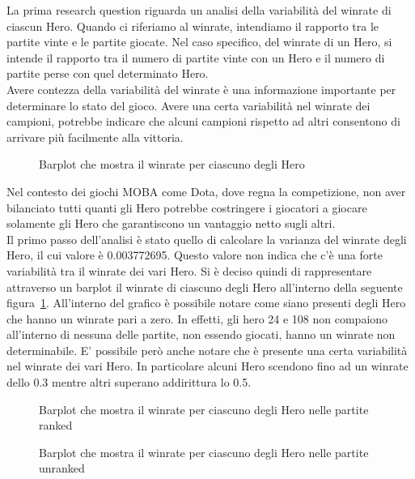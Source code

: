 La prima research question riguarda un analisi della variabilità del winrate di ciascun Hero. Quando ci riferiamo al winrate, intendiamo il rapporto tra le partite vinte e le partite giocate. Nel caso specifico, del winrate di un Hero, si intende il rapporto tra il numero di partite vinte con un Hero e il numero di partite perse con quel determinato Hero. \\
Avere contezza della variabilità del winrate è una informazione importante per determinare lo stato del gioco. Avere una certa variabilità nel winrate dei campioni, potrebbe indicare che alcuni campioni rispetto ad altri consentono di arrivare più facilmente alla vittoria. \\
\begin{figure}[htbp]
\begin{center}

\caption{Barplot che mostra il winrate per ciascuno degli Hero}
\label{winrate_totale}
\end{center}
\end{figure}
Nel contesto dei giochi MOBA come Dota, dove regna la competizione, non aver bilanciato tutti quanti gli Hero potrebbe costringere i giocatori a giocare solamente gli Hero che garantiscono un vantaggio netto sugli altri. \\
Il primo passo dell'analisi è stato quello di calcolare la varianza del winrate degli Hero, il cui valore è 0.003772695. Questo valore non indica che c'è una forte variabilità tra il winrate dei vari Hero.
Si è deciso quindi di rappresentare attraverso un barplot il winrate di ciascuno degli Hero all'interno della seguente figura~\ref{winrate_totale}. All'interno del grafico è possibile notare come siano presenti degli Hero che hanno un winrate pari a zero. In effetti, gli hero 24 e 108 non compaiono all'interno di nessuna delle partite, non essendo giocati, hanno un winrate non determinabile. E' possibile però anche notare che è presente una certa variabilità nel winrate dei vari Hero. In particolare alcuni Hero scendono fino ad un winrate dello 0.3 mentre altri superano addirittura lo 0.5.
\begin{figure}[htbp]
\begin{center}

\caption{Barplot che mostra il winrate per ciascuno degli Hero nelle partite ranked}
\label{winrate_ranked}

\caption{Barplot che mostra il winrate per ciascuno degli Hero nelle partite unranked}
\label{winrate_unranked}
\end{center}
\end{figure}
